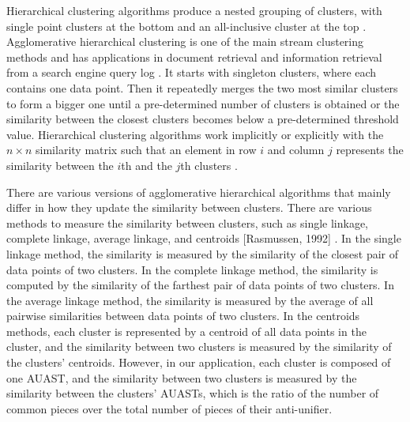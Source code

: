 Hierarchical clustering algorithms produce a nested grouping of clusters, with single point clusters at the bottom and an all-inclusive cluster at the top \cite{karypis1999chameleon}. Agglomerative hierarchical clustering is one of the main stream clustering methods \cite{day1984efficient} and has applications in document retrieval \cite{voorhees1986implementing} and information retrieval from a search engine query log \cite{beeferman2000agglomerative}. It starts with singleton clusters, where each contains one data point. Then it repeatedly merges the two most similar clusters to form a bigger one until a pre-determined number of clusters is obtained or the similarity between the closest clusters becomes below a pre-determined threshold value. Hierarchical clustering algorithms work implicitly or explicitly with the $n \times n$ similarity matrix such that an element in row $i$ and column $j$ represents the similarity between the $i$th and the $j$th clusters \cite{karypis1999chameleon}.

There are various versions of agglomerative hierarchical algorithms that mainly differ in how they update the similarity between clusters. There are various methods to measure the similarity between clusters, such as single linkage, complete linkage, average linkage, and centroids [Rasmussen, 1992] . In the single linkage method, the similarity is measured by the similarity of the closest pair of data points of two clusters. In the complete linkage method, the similarity is computed by the similarity of the farthest pair of data points of two clusters. In the average linkage method, the similarity is measured by the average of all pairwise similarities between data points of two clusters. In the centroids methods, each cluster is represented by a centroid of all data points in the cluster, and the similarity between two clusters is measured by the similarity of the clusters' centroids.
However, in our application, each cluster is composed of one AUAST, and the similarity between two clusters is measured by the similarity between the clusters' AUASTs, which is the ratio of the number of common pieces over the total number of pieces of their anti-unifier.

